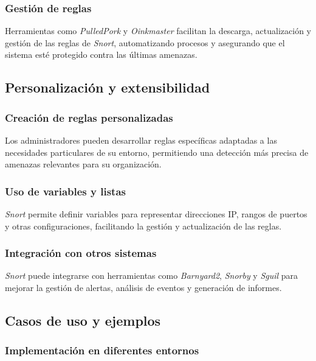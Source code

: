 \documentclass[12pt,a4paper]{report}
\begin{document}
\subsubsection{Gestión de reglas}

Herramientas como \textit{PulledPork} y \textit{Oinkmaster} facilitan la descarga, actualización y gestión de las reglas de \textit{Snort}, automatizando procesos y asegurando que el sistema esté protegido contra las últimas amenazas.

\subsection{Personalización y extensibilidad}

\subsubsection{Creación de reglas personalizadas}

Los administradores pueden desarrollar reglas específicas adaptadas a las necesidades particulares de su entorno, permitiendo una detección más precisa de amenazas relevantes para su organización.

\subsubsection{Uso de variables y listas}

\textit{Snort} permite definir variables para representar direcciones IP, rangos de puertos y otras configuraciones, facilitando la gestión y actualización de las reglas.

\subsubsection{Integración con otros sistemas}

\textit{Snort} puede integrarse con herramientas como \textit{Barnyard2}, \textit{Snorby} y \textit{Sguil} para mejorar la gestión de alertas, análisis de eventos y generación de informes.

\subsection{Casos de uso y ejemplos}

\subsubsection{Implementación en diferentes entornos}
\end{document}
